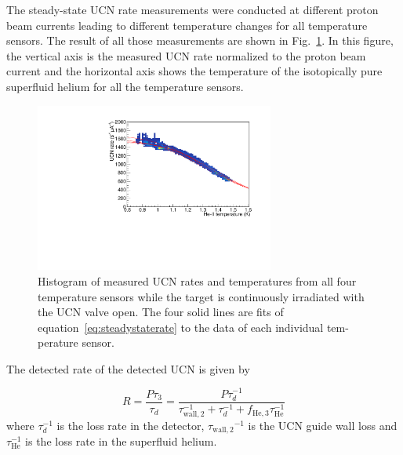 The steady-state UCN rate measurements were conducted at different
proton beam currents leading to different temperature changes for all
temperature sensors. The result of all those measurements are shown in
Fig.~\ref{fig:rate_vs_temp}. In this figure, the vertical axis is the
measured UCN rate normalized to the proton beam current and the
horizontal axis shows the temperature of the isotopically pure
superfluid helium for all the temperature sensors.


\begin{figure}[h!]
  \centering
  \includegraphics[width=0.7\textwidth]{rate_vs_temp.pdf}
  \caption{Histogram of measured UCN rates and temperatures from all
    four temperature sensors while the target is continuously
    irradiated with the UCN valve open. The four solid lines are fits
    of equation~\ref{eq:steadystaterate} to the data of each individual tem- perature
    sensor.}
  \label{fig:rate_vs_temp}
\end{figure}


The detected rate of the detected UCN is given by

\begin{equation}
  \label{eqn:rate}
  R = \frac{P \tau_3}{\tau_d} = \frac{P \tau_d^{-1}}{\tau_\mathrm{wall,2}^{-1} + \tau_d^{-1} + f_\mathrm{He,3}\tau_\mathrm{He}^{-1}}
\end{equation}
where $\tau_d^{-1}$ is the loss rate in the detector,
${\tau_\mathrm{wall,2}}^{-1}$ is the UCN guide wall loss and
  $\tau_\mathrm{He}^{-1}$ is the loss rate in the superfluid helium.

